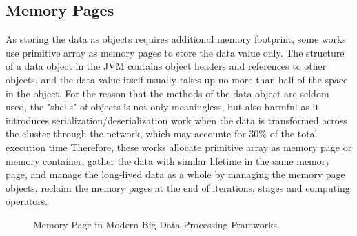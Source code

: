 \documentclass[sigplan, screen]{acmart}
\begin{document}
\subsection{Memory Pages}

As storing the data as objects requires additional memory footprint, some works use primitive array as memory pages to store the data value only. 
The structure of a data object in the JVM contains object headers and references to other objects, and the data value itself usually takes up no more than half of the space 
in the object\cite{navasca2019gerenuk,bu2013bloat}. For the reason that the methods of the data object are seldom used, the "shells" of objects is not only meaningless, but also harmful as it 
introduces serialization/deserialization work when the data is transformed across the cluster through the network, which may accounte for 30$\%$ of the total execution time\cite{navasca2019gerenuk,nguyen2018skyway}   
Therefore, these works allocate primitive array as memory page or memory container, gather the data with similar lifetime in the same memory page, and manage the long-lived data 
as a whole by managing the memory page objects\cite{navasca2019gerenuk,bu2013bloat,nguyen2015facade,lu2016lifetime}, reclaim the memory pages at the end of iterations, stages and
computing operators.

\begin{figure}
  \centering
  \caption{Memory Page in Modern Big Data Processing Framworks.}
\end{figure}
\end{document}
